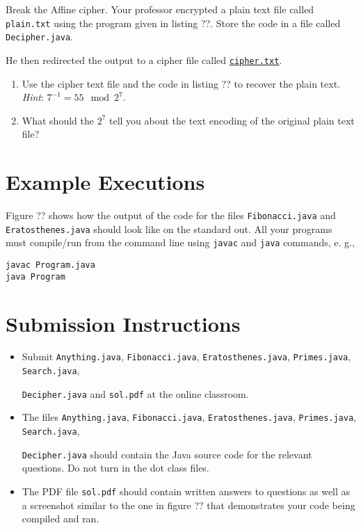 \documentclass{homework}
\newcommand\callit[1]{Store the code in a file called \texttt{#1}.}
\begin{document}
\question Break the Affine cipher. Your professor encrypted a plain text
file called \texttt{plain.txt} using the program given in listing
??. \callit{Decipher.java}

He then redirected the output to a cipher file called
\href{https://tinyurl.com/24pjud2t}{\texttt{cipher.txt}}.

\begin{enumerate}
  \item Use the cipher text file and the code in listing ?? to
        recover the plain text. \textit{Hint}: $7^{-1} = 55 \mod 2^7$.
  \item What should the $2^7$ tell you about the text encoding of the
        original plain text file?
\end{enumerate}

% 

\section{Example Executions}

Figure ?? shows how the output of the code for the files
\texttt{Fibonacci.java} and \texttt{Eratosthenes.java} should look
like on the standard out. All your programs must compile/run from
the command line using \texttt{javac} and \texttt{java} commands,
e. g.,

\begin{verbatim}
javac Program.java
java Program
\end{verbatim}



\section{Submission Instructions}

\begin{itemize}
  \item Submit \texttt{Anything.java}, \texttt{Fibonacci.java},
        \texttt{Eratosthenes.java}, \texttt{Primes.java},
        \texttt{Search.java},

        \noindent\texttt{Decipher.java} and
        \texttt{sol.pdf} at the online classroom.

  \item The files \texttt{Anything.java}, \texttt{Fibonacci.java},
        \texttt{Eratosthenes.java}, \texttt{Primes.java},
        \texttt{Search.java},

        \noindent\texttt{Decipher.java} should contain the
        Java source code for the relevant questions. Do not turn in the dot class files.

  \item The PDF file \texttt{sol.pdf} should contain written answers to
        questions as well as a screenshot similar to the one in figure ??
        that demonstrates your code being compiled and ran.
\end{itemize}
\end{document}
